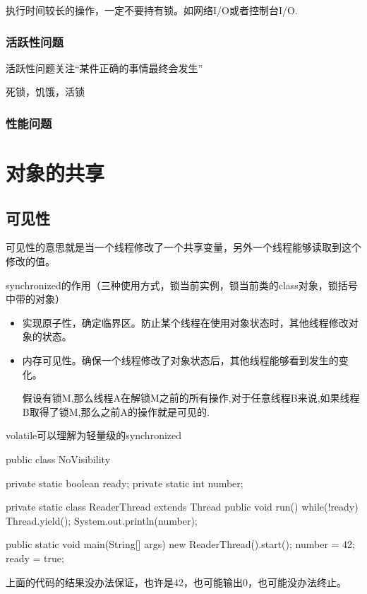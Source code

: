 执行时间较长的操作，一定不要持有锁。如网络I/O或者控制台I/O.



\subsubsection{活跃性问题}

活跃性问题关注“某件正确的事情最终会发生”

死锁，饥饿，活锁

\subsubsection{性能问题}

\section{对象的共享}

\subsection{可见性}

可见性的意思就是当一个线程修改了一个共享变量，另外一个线程能够读取到这个修改的值。


synchronized的作用（三种使用方式，锁当前实例，锁当前类的class对象，锁括号中带的对象）
\begin{itemize}
\item 实现原子性，确定临界区。防止某个线程在使用对象状态时，其他线程修改对象的状态。
\item 内存可见性。确保一个线程修改了对象状态后，其他线程能够看到发生的变化。

假设有锁M,那么线程A在解锁M之前的所有操作,对于任意线程B来说,如果线程B取得了锁M,那么之前A的操作就是可见的.
\end{itemize}

volatile可以理解为轻量级的synchronized

\begin{Java}
public class NoVisibility {
	private static boolean ready;
	private static int number;
	
	private static class ReaderThread extends Thread {
		public void run() {
			while(!ready){
				Thread.yield();
			}
			System.out.println(number);
		}
	}
	
	public static void main(String[] args) {
		new ReaderThread().start();
		number = 42;
		ready = true;
	}
}
\end{Java}

上面的代码的结果没办法保证，也许是42，也可能输出0，也可能没办法终止。

